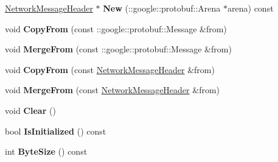 \begin{DoxyCompactItemize}
\item 
\hypertarget{classSimpleChat_1_1NetworkMessageHeader_aeb297b2d6557953e416b452460587c2d}{\hyperlink{classSimpleChat_1_1NetworkMessageHeader}{Network\-Message\-Header} $\ast$ {\bfseries New} (\-::google\-::protobuf\-::\-Arena $\ast$arena) const }\label{classSimpleChat_1_1NetworkMessageHeader_aeb297b2d6557953e416b452460587c2d}

\item 
\hypertarget{classSimpleChat_1_1NetworkMessageHeader_ac53c26c6d84a5116fb42d70a53008303}{void {\bfseries Copy\-From} (const \-::google\-::protobuf\-::\-Message \&from)}\label{classSimpleChat_1_1NetworkMessageHeader_ac53c26c6d84a5116fb42d70a53008303}

\item 
\hypertarget{classSimpleChat_1_1NetworkMessageHeader_a6205622710d8485ab9ffd8d794631cfc}{void {\bfseries Merge\-From} (const \-::google\-::protobuf\-::\-Message \&from)}\label{classSimpleChat_1_1NetworkMessageHeader_a6205622710d8485ab9ffd8d794631cfc}

\item 
\hypertarget{classSimpleChat_1_1NetworkMessageHeader_ab460c8fa9abd6314b0cf49be2c6e26de}{void {\bfseries Copy\-From} (const \hyperlink{classSimpleChat_1_1NetworkMessageHeader}{Network\-Message\-Header} \&from)}\label{classSimpleChat_1_1NetworkMessageHeader_ab460c8fa9abd6314b0cf49be2c6e26de}

\item 
\hypertarget{classSimpleChat_1_1NetworkMessageHeader_a02696f7c2f6bbff7c82f64fd1f615599}{void {\bfseries Merge\-From} (const \hyperlink{classSimpleChat_1_1NetworkMessageHeader}{Network\-Message\-Header} \&from)}\label{classSimpleChat_1_1NetworkMessageHeader_a02696f7c2f6bbff7c82f64fd1f615599}

\item 
\hypertarget{classSimpleChat_1_1NetworkMessageHeader_a33544fbb349ce8275b334e31d4e708f4}{void {\bfseries Clear} ()}\label{classSimpleChat_1_1NetworkMessageHeader_a33544fbb349ce8275b334e31d4e708f4}

\item 
\hypertarget{classSimpleChat_1_1NetworkMessageHeader_acc0a30d58655083c79af4472f7aee3a2}{bool {\bfseries Is\-Initialized} () const }\label{classSimpleChat_1_1NetworkMessageHeader_acc0a30d58655083c79af4472f7aee3a2}

\item 
\hypertarget{classSimpleChat_1_1NetworkMessageHeader_a3e2312da986374bf537e1c173eb220a1}{int {\bfseries Byte\-Size} () const }\label{classSimpleChat_1_1NetworkMessageHeader_a3e2312da986374bf537e1c173eb220a1}


\end{DoxyCompactItemize}
